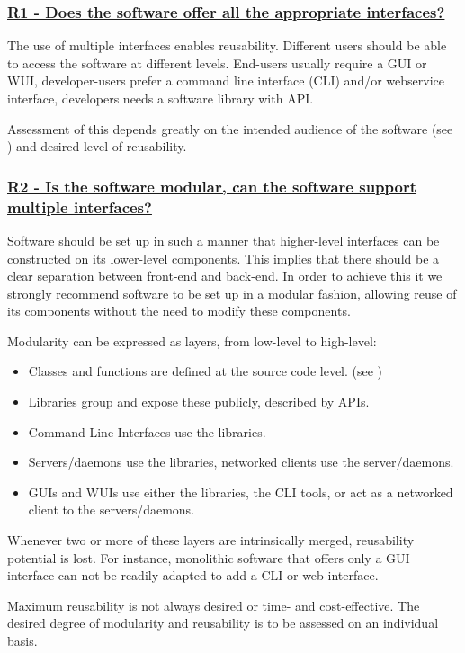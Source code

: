 \documentclass[a4paper,11pt]{article}
\newcommand{\criterion}[2]{\subsubsection*{\underline{#1 - #2}}\label{id:#1}}
\newcommand\CheckTable{%
  \begin{tabular}{ccccc}
    No & Minimal & Adequate & Good & Perfect \\
    0 & 1 & 2 & 3 & 4 \\
    \hline
    $\square$ & $\square$ & $\square$ & $\square$ & $\square$ \\
  \end{tabular}%
}
\newcommand{\refcrit}[1]{%
 \framebox[1.1\width]{\hyperref[id:#1]{#1}}
}
\begin{document}
\newcommand{\rOneID}{R1}
\newcommand{\rOneText}{Does the software offer all the appropriate interfaces?}
\criterion{\rOneID}{\rOneText}

The use of multiple interfaces enables reusability. Different users should be
able to access the software at different levels. End-users usually require a
GUI or WUI, developer-users prefer a command line interface (CLI) and/or
webservice interface, developers needs a software library with API.

Assessment of this depends greatly on the intended audience of the software
(see \refcrit{U2}) and desired level of reusability.


\newcommand{\rTwoID}{R2}
\newcommand{\rTwoText}{Is the software modular, can the software support multiple interfaces?}
\criterion{\rTwoID}{\rTwoText}

Software should be set up in such a manner that higher-level interfaces can be
constructed on its lower-level components. This implies that there should be a
clear separation between front-end and back-end. In order to achieve this it we
strongly recommend software to be set up in a modular fashion, allowing reuse
of its components without the need to modify these components.

Modularity can be expressed as layers, from low-level to high-level:

\begin{itemize}
 \item Classes and functions are defined at the source code level. (see
     \refcrit{R3})
 \item Libraries group and expose these publicly, described by APIs. 
 \item Command Line Interfaces use the libraries.
 \item Servers/daemons use the libraries, networked clients use the server/daemons.
 \item GUIs and WUIs use either the libraries, the CLI tools, or act as a networked client to the servers/daemons.
\end{itemize}

Whenever two or more of these layers are intrinsically merged, reusability potential is lost.
For instance, monolithic software that offers only a GUI interface can not be
readily adapted to add a CLI or web interface.

Maximum reusability is not always desired or time- and cost-effective. The
desired degree of modularity and reusability is to be assessed on an
individual basis.
\end{document}
